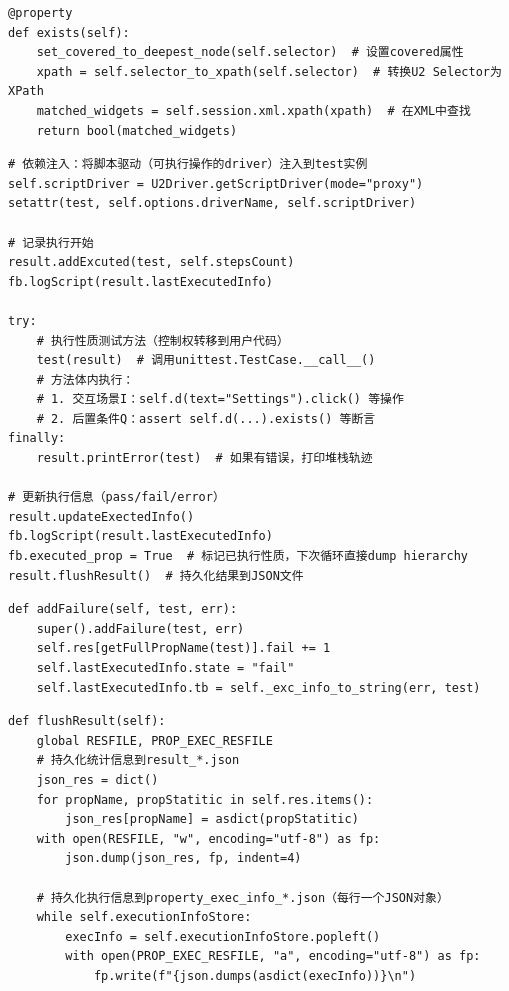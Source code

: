 \documentclass[a4paper, zihao=-4]{ctexart}
\begin{document}
\begin{lstlisting}[label=code:widget_exists, caption=控件存在性检索]
@property
def exists(self):
    set_covered_to_deepest_node(self.selector)  # 设置covered属性
    xpath = self.selector_to_xpath(self.selector)  # 转换U2 Selector为XPath
    matched_widgets = self.session.xml.xpath(xpath)  # 在XML中查找
    return bool(matched_widgets)
\end{lstlisting}

\begin{lstlisting}[label=code:exec_mechanism, caption=驱动注入与验证执行]
# 依赖注入：将脚本驱动（可执行操作的driver）注入到test实例
self.scriptDriver = U2Driver.getScriptDriver(mode="proxy")
setattr(test, self.options.driverName, self.scriptDriver)

# 记录执行开始
result.addExcuted(test, self.stepsCount)
fb.logScript(result.lastExecutedInfo)

try:
    # 执行性质测试方法（控制权转移到用户代码）
    test(result)  # 调用unittest.TestCase.__call__()
    # 方法体内执行：
    # 1. 交互场景I：self.d(text="Settings").click() 等操作
    # 2. 后置条件Q：assert self.d(...).exists() 等断言
finally:
    result.printError(test)  # 如果有错误，打印堆栈轨迹

# 更新执行信息（pass/fail/error）
result.updateExectedInfo()
fb.logScript(result.lastExecutedInfo)
fb.executed_prop = True  # 标记已执行性质，下次循环直接dump hierarchy
result.flushResult()  # 持久化结果到JSON文件
\end{lstlisting}

\begin{lstlisting}[label=code:assert_eval, caption=异常捕捉与状态记录]
def addFailure(self, test, err):
    super().addFailure(test, err)
    self.res[getFullPropName(test)].fail += 1
    self.lastExecutedInfo.state = "fail"
    self.lastExecutedInfo.tb = self._exc_info_to_string(err, test)
\end{lstlisting}

\begin{lstlisting}[label=code:persistence, caption=结果序列化]
def flushResult(self):
    global RESFILE, PROP_EXEC_RESFILE
    # 持久化统计信息到result_*.json
    json_res = dict()
    for propName, propStatitic in self.res.items():
        json_res[propName] = asdict(propStatitic)
    with open(RESFILE, "w", encoding="utf-8") as fp:
        json.dump(json_res, fp, indent=4)
    
    # 持久化执行信息到property_exec_info_*.json（每行一个JSON对象）
    while self.executionInfoStore:
        execInfo = self.executionInfoStore.popleft()
        with open(PROP_EXEC_RESFILE, "a", encoding="utf-8") as fp:
            fp.write(f"{json.dumps(asdict(execInfo))}\n")
\end{lstlisting}
\end{document}

